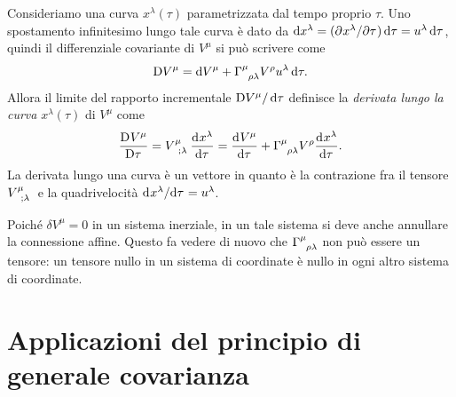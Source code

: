 Consideriamo una curva $x^{\lambda}(\tau)$ parametrizzata dal tempo proprio
$\tau$.  Uno spostamento infinitesimo lungo tale curva è dato da
$\mathop{}\!\mathrm{d} x^{\lambda} = (\partial^{} x^{\lambda} / \partial {\tau}^{}) \mathop{}\!\mathrm{d} \tau = u^{\lambda}\mathop{}\!\mathrm{d}\tau$,
quindi il differenziale covariante di $V^{\mu}$ si può scrivere come
\begin{equation}
  \cdd V^{\mu} = \dd V^{\mu} + \tensor{\Gamma}{^{\mu}_{\rho\lambda}} V^{\rho}
  u^{\lambda }\dd \tau.
\end{equation}
Allora il limite del rapporto incrementale $\mathop{}\!\mathrm{D} V^{\mu}/\mathop{}\!\mathrm{d} \tau$ definisce la
\emph{derivata lungo la curva}
$x^{\lambda}(\tau)$ di $V^{\mu}$ come
\begin{equation}
  \curder{V^{\mu}} = \tensor{V}{^{\mu}_{;\lambda}} \toder{x^{\lambda}}{\tau} =
  \toder{V^{\mu}}{\tau} + \tensor{\Gamma}{^{\mu}_{\rho\lambda}} V^{\rho}
  \toder{x^{\lambda}}{\tau}.
\end{equation}
La derivata lungo una curva è un vettore in quanto è la contrazione fra il
tensore $\tensor{V}{^{\mu}_{;\lambda}}$ e la quadrivelocità
$\mathrm{d}^{}x^{\lambda} / \mathrm{d} {\tau}^{} = u^{\lambda}$.

Poiché $\delta V^{\mu} = 0$ in un sistema inerziale, in un tale sistema si deve
anche annullare la connessione affine.  Questo fa
vedere di nuovo che $\tensor{\Gamma}{^{\mu}_{\rho\lambda}}$ non può essere un
tensore: un tensore nullo in un sistema di coordinate è nullo in ogni altro
sistema di coordinate.

\subsubsection{}
\label{sec:esempio}

\subsection{}
\label{sec:effetto-de-sitter}

\section{Applicazioni del principio di generale covarianza}
\label{sec:applicazioni-generale-covarianza}

